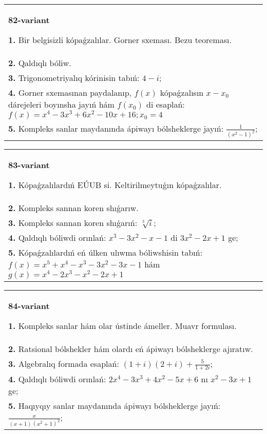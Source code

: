\documentclass{article}
\begin{document}
\begin{tabular}{m{17cm}}
\textbf{82-variant}
\newline

\textbf{1.} Bir belgisizli kópaǵzalılar. Gorner sxeması. Bezu teoreması.  \\
\textbf{2.} Qaldıqlı bóliw.  \\
\textbf{3.} Trigonometriyalıq kórinisin tabıń: $4-i$; \\
\textbf{4.} Gorner sxemasınan paydalanıp, $f(x)$ kópaǵzalısın $x-x_0$ dárejeleri boyınsha jayıń hám $f\left(x_0\right)$ di esaplań: $f(x)=x^4-3 x^3+6 x^2-10 x+16 ; x_0=4$ \\
\textbf{5.} Kompleks sanlar maydanında ápiwayı bólsheklerge jayıń: $\frac{1}{\left(x^2-1\right)^2}$; \\

\end{tabular}
\vspace{1cm}


\begin{tabular}{m{17cm}}
\textbf{83-variant}
\newline

\textbf{1.} Kópaǵzalılardıń EÚUB si. Keltirilmeytuǵın   kópaǵzalılar. \\
\textbf{2.} Kompleks sannan koren shıǵarıw. \\
\textbf{3.} Kompleks sannan koren shıǵarıń:  $\sqrt[3]{i}$; \\
\textbf{4.} Qaldıqlı bóliwdi orınlań: $x^3-3 x^2-x-1$ di $3 x^2-2 x+1$ ge; \\
\textbf{5.} Kópaǵzalılardıń eń úlken ulıwma bóliwshisin tabıń: $f(x)=x^5+x^4-x^3-3 x^2-3 x-1$ hám $g(x)=x^4-2 x^3-x^2-2 x+1$ \\

\end{tabular}
\vspace{1cm}


\begin{tabular}{m{17cm}}
\textbf{84-variant}
\newline

\textbf{1.} Kompleks sanlar hám olar ústinde ámeller. Muavr formulası.  \\
\textbf{2.} Ratsional bólshekler hám olardı eń ápiwayı bólsheklerge ajıratıw. \\
\textbf{3.} Algebralıq formada esaplań:  $(1+i)(2+i)+\frac{5}{1+2 i}$; \\
\textbf{4.} Qaldıqlı bóliwdi orınlań: $2 x^4-3 x^3+4 x^2-5 x+6$ nı $x^2-3 x+1$ ge; \\
\textbf{5.} Haqıyqıy sanlar maydanında ápiwayı bólsheklerge jayıń:  $\frac{x}{(x+1)\left(x^2+1\right)^2}$; \\

\end{tabular}
\vspace{1cm}
\end{document}
